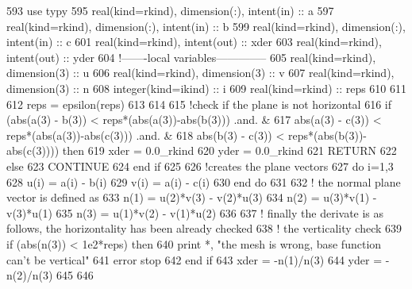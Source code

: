 \begin{DoxyCode}
593       \textcolor{keywordtype}{use }typy
595       \textcolor{keywordtype}{real(kind=rkind)}, \textcolor{keywordtype}{dimension(:)}, \textcolor{keywordtype}{intent(in)} :: a
597       \textcolor{keywordtype}{real(kind=rkind)}, \textcolor{keywordtype}{dimension(:)}, \textcolor{keywordtype}{intent(in)} :: b
599       \textcolor{keywordtype}{real(kind=rkind)}, \textcolor{keywordtype}{dimension(:)}, \textcolor{keywordtype}{intent(in)} :: c
601       \textcolor{keywordtype}{real(kind=rkind)}, \textcolor{keywordtype}{intent(out)} :: xder
603       \textcolor{keywordtype}{real(kind=rkind)}, \textcolor{keywordtype}{intent(out)} :: yder
604       \textcolor{comment}{!-------local variables--------------}
605       \textcolor{keywordtype}{real(kind=rkind)}, \textcolor{keywordtype}{dimension(3)} :: u
606       \textcolor{keywordtype}{real(kind=rkind)}, \textcolor{keywordtype}{dimension(3)} :: v
607       \textcolor{keywordtype}{real(kind=rkind)}, \textcolor{keywordtype}{dimension(3)} :: n
608       \textcolor{keywordtype}{integer(kind=ikind)} :: i
609       \textcolor{keywordtype}{real(kind=rkind)} :: reps
610 
611 
612       reps = epsilon(reps)
613 
614 
615       \textcolor{comment}{!check if the plane is not horizontal}
616       \textcolor{keywordflow}{if} (abs(a(3) - b(3)) < reps*(abs(a(3))-abs(b(3)))  .and.  &
617           abs(a(3) - c(3)) < reps*(abs(a(3))-abs(c(3)))  .and.  &
618           abs(b(3) - c(3)) < reps*(abs(b(3))-abs(c(3)))) \textcolor{keywordflow}{then}
619         xder = 0.0\_rkind
620         yder = 0.0\_rkind
621         \textcolor{keywordflow}{RETURN}
622       \textcolor{keywordflow}{else}
623         \textcolor{keywordflow}{CONTINUE}
624 \textcolor{keywordflow}{      end if}
625 
626       \textcolor{comment}{!creates the plane vectors }
627       \textcolor{keywordflow}{do} i=1,3
628         u(i) = a(i) - b(i)
629         v(i) = a(i) - c(i)
630 \textcolor{keywordflow}{      end do}
631 
632       \textcolor{comment}{! the normal plane vector is defined as}
633       n(1) = u(2)*v(3) - v(2)*u(3)
634       n(2) = u(3)*v(1) - v(3)*u(1)
635       n(3) = u(1)*v(2) - v(1)*u(2)
636 
637       \textcolor{comment}{! finally the derivate is as follows, the horizontality has been already checked}
638       \textcolor{comment}{! the verticality check}
639       \textcolor{keywordflow}{if} (abs(n(3)) < 1e2*reps) \textcolor{keywordflow}{then}
640         print *, \textcolor{stringliteral}{"the mesh is wrong, base function can't be vertical"}
641         error stop
642 \textcolor{keywordflow}{      end if} 
643       xder = -n(1)/n(3)
644       yder = -n(2)/n(3)
645 
646       
\end{DoxyCode}


